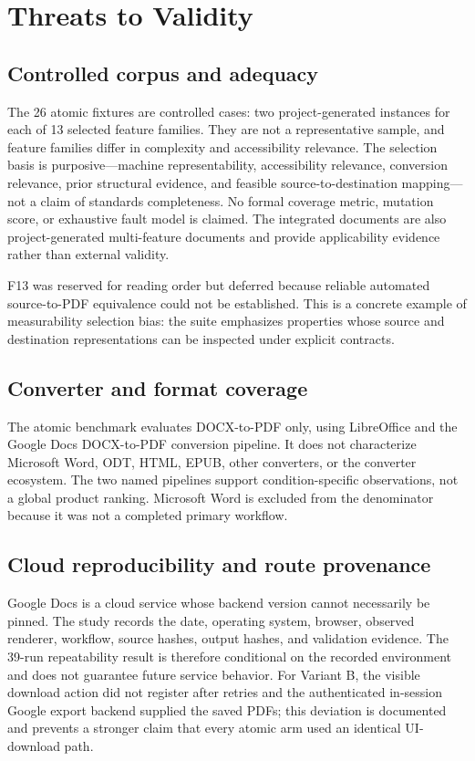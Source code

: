 \section{Threats to Validity}
\label{sec:threats}

\subsection{Controlled corpus and adequacy}

The 26 atomic fixtures are controlled cases: two project-generated instances for each of 13 selected feature families. They are not a representative sample, and feature families differ in complexity and accessibility relevance. The selection basis is purposive—machine representability, accessibility relevance, conversion relevance, prior structural evidence, and feasible source-to-destination mapping—not a claim of standards completeness. No formal coverage metric, mutation score, or exhaustive fault model is claimed. The integrated documents are also project-generated multi-feature documents and provide applicability evidence rather than external validity.

F13 was reserved for reading order but deferred because reliable automated source-to-PDF equivalence could not be established. This is a concrete example of measurability selection bias: the suite emphasizes properties whose source and destination representations can be inspected under explicit contracts.

\subsection{Converter and format coverage}

The atomic benchmark evaluates DOCX-to-PDF only, using LibreOffice and the Google Docs DOCX-to-PDF conversion pipeline. It does not characterize Microsoft Word, ODT, HTML, EPUB, other converters, or the converter ecosystem. The two named pipelines support condition-specific observations, not a global product ranking. Microsoft Word is excluded from the denominator because it was not a completed primary workflow.

\subsection{Cloud reproducibility and route provenance}

Google Docs is a cloud service whose backend version cannot necessarily be pinned. The study records the date, operating system, browser, observed renderer, workflow, source hashes, output hashes, and validation evidence. The 39-run repeatability result is therefore conditional on the recorded environment and does not guarantee future service behavior. For Variant B, the visible download action did not register after retries and the authenticated in-session Google export backend supplied the saved PDFs; this deviation is documented and prevents a stronger claim that every atomic arm used an identical UI-download path.

